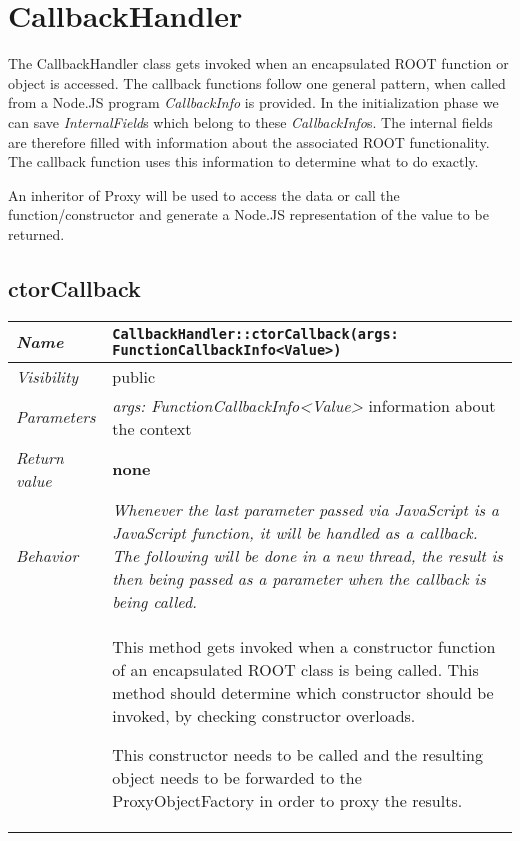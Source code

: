 \chapter{CallbackHandler}
The CallbackHandler class gets invoked when an encapsulated ROOT function or object is accessed.
The callback functions follow one general pattern, when called from a Node.JS program \textit{CallbackInfo} is provided.
In the initialization phase we can save \textit{InternalField}s which belong to these \textit{CallbackInfo}s.
The internal fields are therefore filled with information about the associated ROOT functionality.
The callback function uses this information to determine what to do exactly.

An inheritor of Proxy will be used to access the data or call the function/constructor and generate a Node.JS representation of the value to be returned.
\section{ctorCallback}
\begin{longtable}{p{3cm} @{\hskip 1cm} p{12cm}}
 \hline
\textit{Name} & \texttt{CallbackHandler::ctorCallback(args: FunctionCallbackInfo<Value>)}\\
\hline
 \textit{Visibility} & public\\
\hline
\textit{Parameters} & \textit{args: FunctionCallbackInfo<Value>} information about the context\\
\hline
\textit{Return value} & \textbf{none}\\
  \hline
 \textit{Behavior} &
 \textit{Whenever the last parameter passed via JavaScript is a JavaScript function, it will be handled as a callback. The following will be done in a new thread, the result is then being passed as a parameter when the callback is being called.}\\

 & This method gets invoked when a constructor function of an encapsulated ROOT class is being called.
 This method should determine which constructor should be invoked, by checking constructor overloads.

 This constructor needs to be called and the resulting object needs to be forwarded to the ProxyObjectFactory in order to proxy the results.\\
\hline
\end{longtable}
